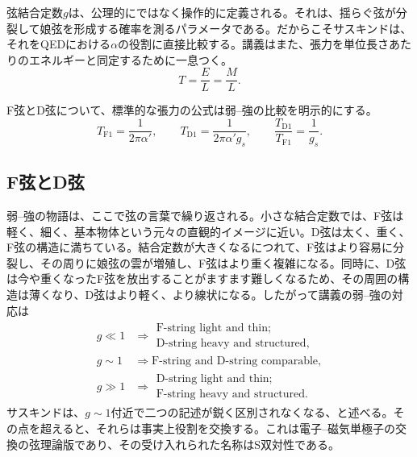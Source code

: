 弦結合定数\(g\)は、公理的にではなく操作的に定義される。それは、揺らぐ弦が分裂して娘弦を形成する確率を測るパラメータである。だからこそサスキンドは、それをQEDにおける\(\alpha\)の役割に直接比較する。講義はまた、張力を単位長さあたりのエネルギーと同定するために一息つく。
\begin{equation}
T=\frac{E}{L}=\frac{M}{L}.
\end{equation}

F弦とD弦について、標準的な張力の公式は弱--強の比較を明示的にする。
\begin{equation}
T_{\mathrm{F1}}=\frac{1}{2\pi\alpha'},
\qquad
T_{\mathrm{D1}}=\frac{1}{2\pi\alpha' g_s},
\qquad
\frac{T_{\mathrm{D1}}}{T_{\mathrm{F1}}}=\frac{1}{g_s}.
\end{equation}

\subsection{F弦とD弦}

弱--強の物語は、ここで弦の言葉で繰り返される。小さな結合定数では、F弦は軽く、細く、基本物体という元々の直観的イメージに近い。D弦は太く、重く、F弦の構造に満ちている。結合定数が大きくなるにつれて、F弦はより容易に分裂し、その周りに娘弦の雲が増殖し、F弦はより重く複雑になる。同時に、D弦は今や重くなったF弦を放出することがますます難しくなるため、その周囲の構造は薄くなり、D弦はより軽く、より線状になる。したがって講義の弱--強の対応は
\begin{align}
g \ll 1
&\Rightarrow
\begin{gathered}
\text{F-string light and thin;}\\
\text{D-string heavy and structured},
\end{gathered}\\
g \sim 1
&\Rightarrow
\text{F-string and D-string comparable},\\
g \gg 1
&\Rightarrow
\begin{gathered}
\text{D-string light and thin;}\\
\text{F-string heavy and structured}.
\end{gathered}
\end{align}
サスキンドは、\(g\sim 1\)付近で二つの記述が鋭く区別されなくなる、と述べる。その点を超えると、それらは事実上役割を交換する。これは電子--磁気単極子の交換の弦理論版であり、その受け入れられた名称はS双対性である。

